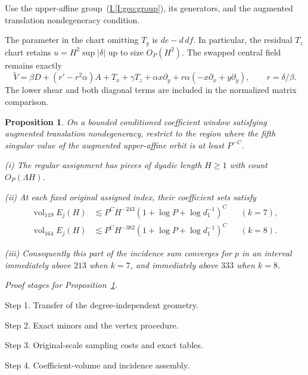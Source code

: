 \documentclass[11pt]{amsart}
\newtheorem{proposition}[theorem]{Proposition}
\theoremstyle{definition}
\theoremstyle{remark}
\numberwithin{equation}{section}
\newcommand{\partIref}[1]{\hyperref[I:#1]{I.\ref*{I:#1}}}
\newcommand{\partIeqref}[1]{\textup{(\partIref{#1})}}
\begin{document}
Use the upper-affine group~\partIeqref{geo:group}, its generators, and the augmented translation nondegeneracy condition. 

The parameter in the chart omitting $T_y$ is $de-d\,df$. In particular, the residual $T_z$ chart retains $u=H^2\sup|\delta|$ up to size $O_P(H^2)$. The swapped central field remains exactly
\begin{equation}\label{low:78:h3r:swap}
\widetilde V=\beta D+(r'-r^2\alpha)A+T_x+\gamma T_z+\alpha x\partial_y+r\alpha(-x\partial_x+y\partial_y),\qquad r=\delta/\beta.
\end{equation}
The lower shear and both diagonal terms are included in the normalized matrix comparison.

\begin{proposition}\label{low:78:h3r:regular-count}
On a bounded conditioned coefficient window satisfying augmented translation nondegeneracy, restrict to the region where the fifth singular value of the augmented upper-affine orbit is at least $P^{-C}$.

\noindent\textup{(i)} The regular assignment has pieces of dyadic length $H\ge1$ with count $O_P(\Lambda H)$.

\noindent\textup{(ii)} At each fixed original assigned index, their coefficient sets satisfy
\begin{equation}\label{low:78:h3r:regular-tails}
\begin{aligned}
\operatorname{vol}_{119}E_j(H)&\lesssim P^C H^{-243}(1+\log P+\log d_1^{-1})^C &&(k=7),\\
\operatorname{vol}_{164}E_j(H)&\lesssim P^C H^{-382}(1+\log P+\log d_1^{-1})^C &&(k=8).
\end{aligned}
\end{equation}

\noindent\textup{(iii)} Consequently this part of the incidence sum converges for $p$ in an interval immediately above $213$ when $k=7$, and immediately above $333$ when $k=8$.
\end{proposition}

\par\smallskip
\noindent\textit{Proof stages for Proposition~\ref{low:78:h3r:regular-count}.}\par\nobreak
\noindent\textup{Step 1.} Transfer of the degree-independent geometry.\par\nobreak
\noindent\textup{Step 2.} Exact minors and the vertex procedure.\par\nobreak
\noindent\textup{Step 3.} Original-scale sampling costs and exact tables.\par\nobreak
\noindent\textup{Step 4.} Coefficient-volume and incidence assembly.\par\nobreak
\smallskip
\end{document}
